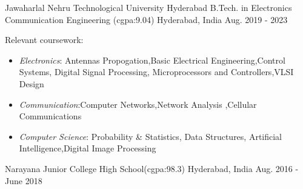 \documentclass[11pt, a4paper]{russell}
\begin{document}
\begin{cventries}

  \cventry
  {\small Jawaharlal Nehru Technological University Hyderabad} %
  {\normalsize B.Tech. in Electronics Communication Engineering
  (cgpa:9.04)} %
  {\small Hyderabad, India} %
  {\small Aug. 2019 - 2023} %
  {
    \begin{cvitems} %
    \item {\small Relevant coursework:}
      \begin{itemize}
        \item \small \textit{Electronics}: Antennas Propogation,Basic Electrical Engineering,Control Systems, Digital Signal Processing, Microprocessors and Controllers,VLSI Design 
        \item \small \textit{Communication}:Computer Networks,Network Analysis ,Cellular Communications
        \item \small \textit{Computer Science}:  Probability \& Statistics, Data Structures, Artificial Intelligence,Digital Image Processing 
    \end{itemize}
    \end{cvitems}
  }

  \cventry
  {\small Narayana Junior College} %
  {\normalsize High School(cgpa:98.3)} %
  {\small Hyderabad, India} %
  {\small Aug. 2016 - June 2018} %
  {
  }

  


\end{cventries}
\end{document}
